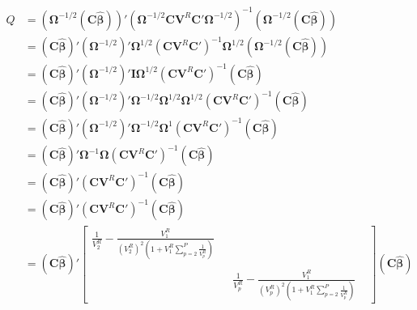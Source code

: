 \begin{equation}
\begin{split}
    Q &= \left( \mathbf{\Omega}^{-1/2}(\mathbf{C}\mathbf{\hat{\beta}}) \right)' \left(\mathbf{\Omega}^{-1/2}\mathbf{C}\mathbf{V}^R\mathbf{C}'\mathbf{\Omega}^{-1/2} \right)^{-1} \left( \mathbf{\Omega}^{-1/2}(\mathbf{C}\mathbf{\hat{\beta}}) \right) \\
     & = (\mathbf{C}\mathbf{\hat{\beta}})' \left( \mathbf{\Omega}^{-1/2} \right)' \mathbf{\Omega}^{1/2} \left(\mathbf{C}\mathbf{V}^R\mathbf{C}'\right)^{-1} \mathbf{\Omega}^{1/2} \left( \mathbf{\Omega}^{-1/2}(\mathbf{C}\mathbf{\hat{\beta}}) \right) \\
     & = (\mathbf{C}\mathbf{\hat{\beta}})' \left( \mathbf{\Omega}^{-1/2} \right)' \mathbf{I}  \mathbf{\Omega}^{1/2} \left(\mathbf{C}\mathbf{V}^R\mathbf{C}'\right)^{-1} (\mathbf{C}\mathbf{\hat{\beta}})  \\
     & = (\mathbf{C}\mathbf{\hat{\beta}})' \left( \mathbf{\Omega}^{-1/2} \right)'  \mathbf{\Omega}^{-1/2} \mathbf{\Omega}^{1/2} \mathbf{\Omega}^{1/2} \left(\mathbf{C}\mathbf{V}^R\mathbf{C}'\right)^{-1} (\mathbf{C}\mathbf{\hat{\beta}})  \\
      & = (\mathbf{C}\mathbf{\hat{\beta}})' \left( \mathbf{\Omega}^{-1/2} \right)'  \mathbf{\Omega}^{-1/2} \mathbf{\Omega}^{1} \left(\mathbf{C}\mathbf{V}^R\mathbf{C}'\right)^{-1} (\mathbf{C}\mathbf{\hat{\beta}})  \\
      & = (\mathbf{C}\mathbf{\hat{\beta}})' \mathbf{\Omega}^{-1} \mathbf{\Omega} \left(\mathbf{C}\mathbf{V}^R\mathbf{C}'\right)^{-1} (\mathbf{C}\mathbf{\hat{\beta}})  \\
      & = (\mathbf{C}\mathbf{\hat{\beta}})' \left(\mathbf{C}\mathbf{V}^R\mathbf{C}'\right)^{-1} (\mathbf{C}\mathbf{\hat{\beta}})  \\
      & = (\mathbf{C}\mathbf{\hat{\beta}})' \left(\mathbf{C}\mathbf{V}^R\mathbf{C}'\right)^{-1} (\mathbf{C}\mathbf{\hat{\beta}})  \\
      & =(\mathbf{C}\mathbf{\hat{\beta}})' \begin{bmatrix}
          \frac{1}{V_2^R} - \frac{V_1^R}{\left(V_2^R\right)^2 \left(1 + V_1^R \sum_{p=2}^P \frac{1}{V_p^R} \right)} & & \\
          & & &\\
          & & \frac{1}{V_p^R} - \frac{V_1^R}{\left(V_p^R\right)^2 \left(1 + V_1^R \sum_{p=2}^P \frac{1}{V_p^R} \right)}
      \end{bmatrix} (\mathbf{C}\mathbf{\hat{\beta}}) 
\end{split}
\end{equation}

